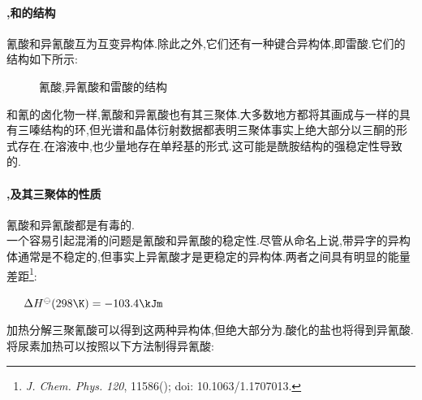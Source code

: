 \documentclass{ctexart}
\begin{document}
\paragraph{,和的结构}
氰酸和异氰酸互为互变异构体.除此之外,它们还有一种键合异构体,即雷酸.它们的结构如下所示:
\begin{figure}[H]
    \centering
    \caption{氰酸,异氰酸和雷酸的结构}
\end{figure}
和氰的卤化物一样,氰酸和异氰酸也有其三聚体.大多数地方都将其画成与一样的具有三嗪结构的环,但光谱和晶体衍射数据都表明三聚体事实上绝大部分以三酮的形式存在.在溶液中,也少量地存在单羟基的形式.这可能是酰胺结构的强稳定性导致的.
\paragraph{,及其三聚体的性质}
氰酸和异氰酸都是有毒的.\\
\indent 一个容易引起混淆的问题是氰酸和异氰酸的稳定性.尽管从命名上说,带异字的异构体通常是不稳定的,但事实上异氰酸才是更稳定的异构体.两者之间具有明显的能量差距\footnote{\textit{J. Chem. Phys.}  \textit{120}, 11586(); doi: 10.1063/1.1707013.}:
\begin{center}
    \ \ \ $\Delta H^{\ominus}(298\K)=-103.4\kJm$
\end{center}

\indent 加热分解三聚氰酸可以得到这两种异构体,但绝大部分为.酸化的盐也将得到异氰酸.将尿素加热可以按照以下方法制得异氰酸:
\begin{center}
\end{center}
\end{document}
